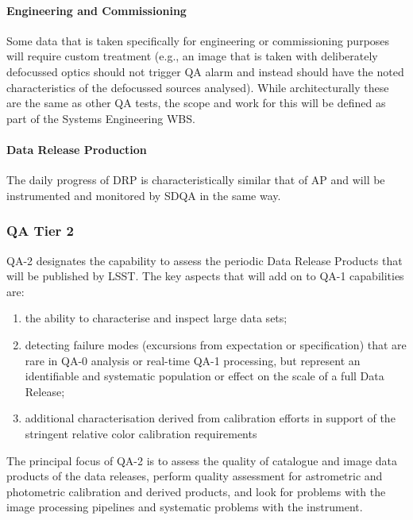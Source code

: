 \paragraph{Engineering and Commissioning}

Some data that is taken specifically for engineering or commissioning purposes will require custom treatment (e.g., an image that is taken with deliberately defocussed optics should not trigger QA alarm and instead should have the noted characteristics of the defocussed sources analysed). While architecturally these are the same as other QA tests, the scope and work for this will be defined as part of the Systems Engineering WBS.

\paragraph{Data Release Production}

The daily progress of DRP is characteristically similar that of AP and will be instrumented and monitored by SDQA in the same way.

\subsubsection{QA Tier 2}

QA-2 designates the capability to assess the periodic Data Release Products that will be published by LSST.  The key aspects that will add on to QA-1 capabilities are:

\begin{enumerate}

\item the ability to characterise and inspect large data sets;

\item detecting failure modes (excursions from expectation or specification) that are rare in QA-0 analysis or real-time QA-1 processing, but represent an identifiable and systematic population or effect on the scale of a full Data Release;

\item additional characterisation derived from calibration efforts in support of the stringent relative color calibration requirements

\end{enumerate}

The principal focus of QA-2 is to assess the quality of catalogue and image data products of the data releases, perform quality assessment for astrometric and photometric calibration and derived products, and look for problems with the image processing pipelines and systematic problems with the instrument.

